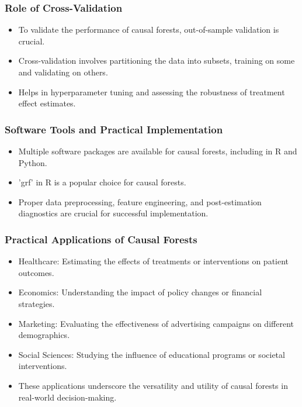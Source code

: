 \documentclass{beamer}
\begin{document}
\begin{frame}
\frametitle{Role of Cross-Validation}
\begin{itemize}
    \item To validate the performance of causal forests, out-of-sample validation is crucial.
    \item Cross-validation involves partitioning the data into subsets, training on some and validating on others.
    \item Helps in hyperparameter tuning and assessing the robustness of treatment effect estimates.
\end{itemize}
\end{frame}


\begin{frame}
\frametitle{Software Tools and Practical Implementation}
\begin{itemize}
    \item Multiple software packages are available for causal forests, including in R and Python.
    \item 'grf' in R is a popular choice for causal forests.
    \item Proper data preprocessing, feature engineering, and post-estimation diagnostics are crucial for successful implementation.
\end{itemize}
\end{frame}




\begin{frame}
\frametitle{Practical Applications of Causal Forests}
\begin{itemize}
    \item Healthcare: Estimating the effects of treatments or interventions on patient outcomes.
    \item Economics: Understanding the impact of policy changes or financial strategies.
    \item Marketing: Evaluating the effectiveness of advertising campaigns on different demographics.
    \item Social Sciences: Studying the influence of educational programs or societal interventions.
    \item These applications underscore the versatility and utility of causal forests in real-world decision-making.
\end{itemize}
\end{frame}
\end{document}
